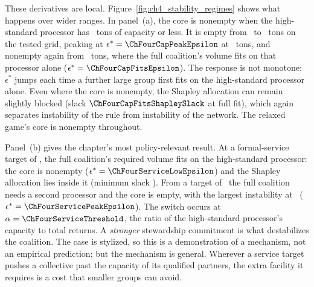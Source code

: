These derivatives are local. Figure~\ref{fig:ch4_stability_regimes} shows what happens over wider ranges. In panel~(a), the core is nonempty when the high-standard processor has \ChFourCapStableBelow\ tons of capacity or less. It is empty from \ChFourCapWindowLow\ to \ChFourCapWindowHigh\ tons on the tested grid, peaking at $\epsilon^*=\ChFourCapPeakEpsilon$ at \ChFourCapPeakAt\ tons, and nonempty again from \ChFourCapStableAbove\ tons, where the full coalition's volume fits on that processor alone ($\epsilon^*=\ChFourCapFitsEpsilon$). The response is not monotone: $\epsilon^*$ jumps each time a further large group first fits on the high-standard processor alone. Even where the core is nonempty, the Shapley allocation can remain slightly blocked (slack $\ChFourCapFitsShapleySlack$ at full fit), which again separates instability of the rule from instability of the network. The relaxed game's core is nonempty throughout.

Panel~(b) gives the chapter's most policy-relevant result. At a formal-service target of \ChFourServiceLowAt, the full coalition's required volume fits on the high-standard processor: the core is nonempty ($\epsilon^*=\ChFourServiceLowEpsilon$) and the Shapley allocation lies inside it (minimum slack \ChFourServiceLowShapleySlack). From a target of \ChFourServiceFirstUnstable\ the full coalition needs a second processor and the core is empty, with the largest instability at \ChFourServicePeakAt\ ($\epsilon^*=\ChFourServicePeakEpsilon$). The switch occurs at $\alpha=\ChFourServiceThreshold$, the ratio of the high-standard processor's capacity to total returns. A \emph{stronger} stewardship commitment is what destabilizes the coalition. The case is stylized, so this is a demonstration of a mechanism, not an empirical prediction; but the mechanism is general. Wherever a service target pushes a collective past the capacity of its qualified partners, the extra facility it requires is a cost that smaller groups can avoid.

